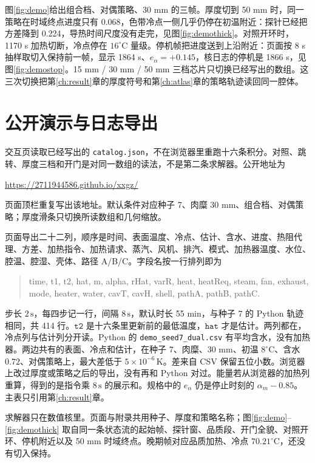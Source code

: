 图\ref{fig:demo}给出组合档、对偶策略、30 mm 的三帧。厚度切到 50 mm 时，同一策略在时域终点进度只有 0.068，色带冷点一侧几乎仍停在初温附近：探针已经把方差降到 0.224，导热时间尺度没有走完，见图\ref{fig:demothick}。对照开环时，1170 s 加热切断，冷点停在 \(16^\circ\mathrm{C}\) 量级。停机帧把进度送到上沿附近：页面按 8 s 抽样取切入保持前一帧，显示 1864 s、\(e_{\alpha}=+0.145\)，核日志的停机是 1866 s，见图\ref{fig:demostop}。15 mm / 30 mm / 50 mm 三档芯片只切换已经写出的数组。这三次切换把第\ref{ch:result}章的厚度符号和第\ref{ch:atlas}章的策略轨迹读回同一腔体。

\section{公开演示与日志导出}

交互页读取已经写出的 \texttt{catalog.json}，不在浏览器里重跑十六条积分。对照、跳转、厚度三档和开门是对同一数组的读法，不是第二条求解器。公开地址为
\begin{center}
\url{https://2711944586.github.io/xxgz/}
\end{center}
页面顶栏重复写出该地址。默认条件对应种子 7、肉糜 30 mm、组合档、对偶策略；厚度滑条只切换所读数组和几何缩放。

页面导出二十二列，顺序是时间、表面温度、冷点、估计、含水、进度、热阻代理、方差、加热指令、加热请求、蒸汽、风机、排汽、模式、加热器温度、水位、腔温、腔湿、壳体、路径 A/B/C。字段名按一行排列即为
\begin{quote}\small\ttfamily\raggedright
time, t1, t2, hat, m, alpha, rHat, varR, heat, heatReq, steam, fan, exhaust, mode, heater, water, cavT, cavH, shell, pathA, pathB, pathC.
\end{quote}
步长 \(2\,\mathrm{s}\)，每四步记一行，间隔 \(8\,\mathrm{s}\)，默认时长 55 min，与种子 7 的 Python 轨迹相同，共 414 行。\(\texttt{t2}\) 是十六条里更新前的最低温度，\(\texttt{hat}\) 才是估计。两列都在，冷点列与估计列分开读。Python 的 \texttt{demo\_seed7\_dual.csv} 有平均含水，没有加热器。两边共有的表面、冷点和估计，在种子 7、肉糜、30 mm、初温 \(8^\circ\mathrm{C}\)、含水 0.72、对偶策略上，最大差低于 \(5\times 10^{-6}\,\mathrm{K}\)。差来自 CSV 保留五位小数。浏览器上改过厚度或策略之后的导出，没有再和 Python 对过。能量若从浏览器的加热列重算，得到的是指令乘 \(8\,\mathrm{s}\) 的展示和。规格中的 \(e_\alpha\) 仍是停止时刻的 \(\alpha_m-0.85\)。主表只引用第\ref{ch:result}章。

求解器只在数值核里。页面与附录共用种子、厚度和策略名称；图\ref{fig:demo}--\ref{fig:demothick} 取自同一条状态流的起始帧、探针窗、品质段、开门全貌、对照开环、停机附近以及 50 mm 时域终点。晚期帧对应品质加热、冷点 \(70.21^\circ\mathrm{C}\)，还没有切入保持。

